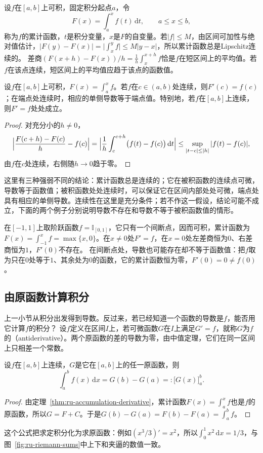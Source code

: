 设$f$在$[a,b]$上可积，固定积分起点$a$，令
\[
 F(x)=\int_a^xf(t)\,\mathrm dt,\qquad a\leq x\leq b,
\]
称为$f$的累计函数，$t$是积分变量，$x$是$F$的自变量。若$|f|\leq M$，由区间可加性与绝对值估计，$|F(y)-F(x)|=\bigl|\int_x^yf\bigr|\leq M|y-x|$，所以累计函数总是Lipschitz连续的。
差商$(F(x+h)-F(x))/h=\frac1h\int_x^{x+h}f$恰是$f$在短区间上的平均值。若$f$在该点连续，短区间上的平均值应趋于该点的函数值。
\begin{theorem}[累计函数的导数]
\label{thm:ru-accumulation-derivative}
设$f$在$[a,b]$上可积，$F(x)=\int_a^xf$。若$f$在$c\in(a,b)$处连续，则$F'(c)=f(c)$；在端点处连续时，相应的单侧导数等于端点值。特别地，若$f$在$[a,b]$上连续，则$F'=f$处处成立。
\end{theorem}
\begin{proof}
对充分小的$h\neq0$，
\[
 \Bigl|\frac{F(c+h)-F(c)}h-f(c)\Bigr|=\Bigl|\frac1h\int_c^{c+h}\bigl(f(t)-f(c)\bigr)\,\mathrm dt\Bigr|\leq\sup_{|t-c|\leq|h|}|f(t)-f(c)|,
\]
由$f$在$c$处连续，右侧随$h\to0$趋于零。
\end{proof}
这里有三种强弱不同的结论：累计函数总是连续的；它在被积函数的连续点可微，导数等于函数值；被积函数处处连续时，可以保证它在区间内部处处可微，端点处具有相应的单侧导数。连续性在这里是充分条件；若不作这一假设，结论可能不成立，下面的两个例子分别说明导数不存在和导数不等于被积函数值的情形。
\begin{example}[被积函数间断处的累计函数]
\label{ex:ru-accumulation-at-discontinuity}
在$[-1,1]$上取阶跃函数$f=\mathbb I_{[0,1]}$，它只有一个间断点，因而可积，累计函数为$F(x)=\int_{-1}^xf=\max\{x,0\}$。在$x\neq0$处$F'=f$，在$x=0$处左差商恒为$0$、右差商恒为$1$，$F'(0)$不存在。
在间断点处，导数也可能存在却不等于函数值：把$f$取为只在$0$处等于$1$、其余处为$0$的函数，它的累计函数恒为零，$F'(0)=0\neq f(0)$。
\end{example}

\subsection{由原函数计算积分}
\label{sec:ru-newton-leibniz}

上一小节从积分出发得到导数。反过来，若已经知道一个函数的导数是$f$，能否用它计算$f$的积分？
设$f$定义在区间$I$上，若可微函数$G$在$I$上满足$G'=f$，就称$G$为$f$的（antiderivative）。两个原函数的差的导数为零，由中值定理，它们在同一区间上只相差一个常数。
\begin{theorem}
\label{thm:ru-newton-leibniz}
设$f$在$[a,b]$上连续，$G$是它在$[a,b]$上的任一原函数，则
\[
 \int_a^bf(x)\,\mathrm dx=G(b)-G(a)=:\bigl[G(x)\bigr]_a^b.
\]
\end{theorem}
\begin{proof}
由定理~\ref{thm:ru-accumulation-derivative}，累计函数$F(x)=\int_a^xf$也是$f$的原函数，所以$G=F+C$。于是$G(b)-G(a)=F(b)-F(a)=\int_a^bf$。
\end{proof}
这个公式把求定积分化为求原函数：例如$(x^3/3)'=x^2$，所以$\int_0^1x^2\,\mathrm dx=1/3$，与图~\ref{fig:ru-riemann-sums}中上下和夹逼的数值一致。

